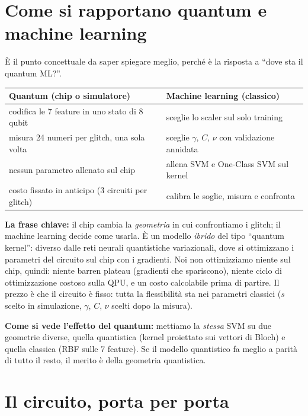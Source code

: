 \section{Come si rapportano quantum e machine learning}
È il punto concettuale da saper spiegare meglio, perché è la risposta a “dove sta il quantum ML?”.

\begin{center}
\begin{tabularx}{\textwidth}{@{}>{\raggedright\arraybackslash}X>{\raggedright\arraybackslash}X@{}}
\toprule
\textbf{Quantum (chip o simulatore)} & \textbf{Machine learning (classico)}\\
\midrule
codifica le 7 feature in uno stato di 8 qubit & sceglie lo scaler sul solo training\\
misura 24 numeri per glitch, una sola volta & sceglie $\gamma$, $C$, $\nu$ con validazione annidata\\
nessun parametro allenato sul chip & allena SVM e One-Class SVM sul kernel\\
costo fissato in anticipo (3 circuiti per glitch) & calibra le soglie, misura e confronta\\
\bottomrule
\end{tabularx}
\end{center}

\textbf{La frase chiave:} il chip cambia la \emph{geometria} in cui confrontiamo i glitch; il machine learning decide
come usarla. È un modello \emph{ibrido} del tipo “quantum kernel”: diverso dalle reti neurali quantistiche variazionali,
dove si ottimizzano i parametri del circuito sul chip con i gradienti. Noi non ottimizziamo niente sul chip, quindi:
niente barren plateau (gradienti che spariscono), niente ciclo di ottimizzazione costoso sulla QPU, e un costo
calcolabile prima di partire. Il prezzo è che il circuito è fisso: tutta la flessibilità sta nei parametri classici
($s$ scelto in simulazione, $\gamma$, $C$, $\nu$ scelti dopo la misura).

\textbf{Come si vede l’effetto del quantum:} mettiamo la \emph{stessa} SVM su due geometrie diverse, quella
quantistica (kernel proiettato sui vettori di Bloch) e quella classica (RBF sulle 7 feature). Se il modello quantistico
fa meglio a parità di tutto il resto, il merito è della geometria quantistica.

\section{Il circuito, porta per porta}


